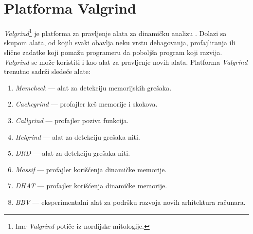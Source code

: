 \documentclass[12pt,oneside]{memoir}
\theoremstyle{plain}
\theoremstyle{definition}
\begin{document}
\chapter{Platforma Valgrind}
\textit{Valgrind}\footnote{ Ime \textit{Valgrind} potiče iz nordijske mitologije.} je platforma za pravljenje alata za dinamičku analizu \cite{Valgrind}. Dolazi sa skupom alata, od kojih svaki obavlja neku vrstu debagovanja, profajliranja ili slične zadatke koji pomažu programeru da poboljša program koji razvija. \textit{Valgrind} se može koristiti i kao alat za pravljenje novih alata. 
Platforma \textit{Valgrind} trenutno sadrži sledeće alate:
\begin{enumerate}
  \item \textit{Memcheck} \cite{ValgrindDOC} --- alat za detekciju memorijskih grešaka.
  \item \textit{Cachegrind}  \cite{Cachegrind} --- profajler keš memorije i skokova. 
  \item \textit{Callgrind} \cite{Callgrind} --- profajler poziva funkcija.
  \item \textit{Helgrind} \cite{Helgrind} --- alat za detekciju grešaka niti.
  \item \textit{DRD} \cite{Drd} --- alat za detekciju grešaka niti. 
  \item \textit{Massif} \cite{Massif} --- profajler korišćenja dinamičke memorije.
  \item \textit{DHAT} \cite{DHAT} --- profajler korišćenja dinamičke memorije. %
  \item \textit{BBV} \cite{BBV} --- eksperimentalni alat za podršku razvoja novih arhitektura računara. %
\end{enumerate}
\end{document}

